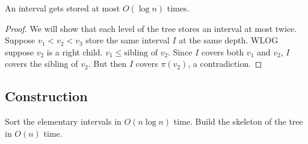 \begin{center}
\end{center}
\begin{lemma}
    An interval gets stored at most $O(\log n)$ times.
\end{lemma}
\begin{proof}
    We will show that each level of the tree stores an interval at most
    twice.
    Suppose $v_1 < v_2 < v_3$ store the same interval $I$ at the same depth.
    WLOG suppose $v_2$ is a right child.
    $v_1 \le \text{sibling of } v_2$.
    Since $I$ covers both $v_1$ and $v_2$, $I$ covers the sibling of $v_2$.
    But then $I$ covers $\pi(v_2)$, a contradiction.
\end{proof}

\subsection{Construction} \label{sec:segtree:construction}
Sort the elementary intervals in $O(n \log n)$ time.
Build the skeleton of the tree in $O(n)$ time.

